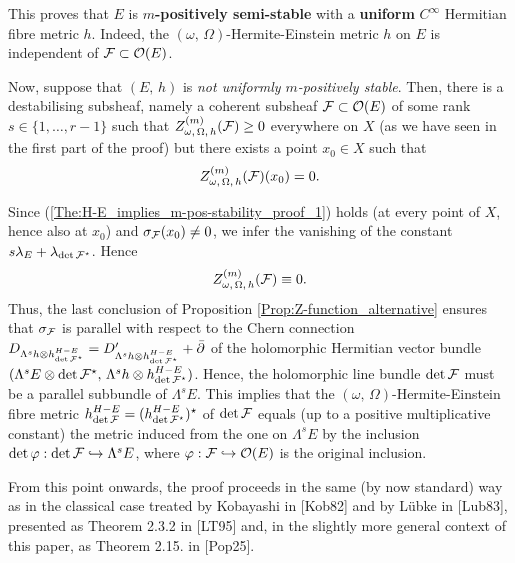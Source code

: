 \documentclass[12pt]{article}
\begin{document}
  This proves that $E$ is {\bf $m$-positively semi-stable} with a {\bf uniform} $C^\infty$ Hermitian fibre metric $h$. Indeed, the $(\omega,\,\Omega)$-Hermite-Einstein metric $h$ on $E$ is independent of ${\cal F}\subset{\cal O}(E)$.

\vspace{1ex}


Now, suppose that $(E,\,h)$ is {\it not uniformly $m$-positively stable}. Then, there is a destabilising subsheaf, namely a coherent subsheaf ${\cal F}\subset{\cal O}(E)$ of some rank $s\in\{1,\dots , r-1\}$ such that $Z_{\omega,\,\Omega,\,h}^{(m)}({\cal F})\geq 0$ everywhere on $X$ (as we have seen in the first part of the proof) but there exists a point $x_0\in X$ such that \begin{eqnarray*}Z_{\omega,\,\Omega,\,h}^{(m)}({\cal F})(x_0) = 0.\end{eqnarray*}

Since (\ref{The:H-E_implies_m-pos-stability_proof_1}) holds (at every point of $X$, hence also at $x_0$) and $\sigma_{\cal F}(x_0)\neq 0$, we infer the vanishing of the constant $s\lambda_E + \lambda_{\det{\cal F}^\star}$. Hence \begin{eqnarray*}Z_{\omega,\,\Omega,\,h}^{(m)}({\cal F})\equiv 0.\end{eqnarray*} Thus, the last conclusion of Proposition \ref{Prop:Z-function_alternative} ensures that $\sigma_{{\cal F}}$ is parallel with respect to the Chern connection $D_{\Lambda^sh\otimes h^{H-E}_{\det{\cal F}^\star}} = D_{\Lambda^sh\otimes h^{H-E}_{\det{\cal F}^\star}}' + \bar\partial$ of the holomorphic Hermitian vector bundle $(\Lambda^s E\otimes\det{\cal F}^\star,\,\Lambda^sh\otimes h^{H-E}_{\det{\cal F}^\star})$. Hence, the holomorphic line bundle $\det{\cal F}$ must be a parallel subbundle of $\Lambda^s E$. This implies that the $(\omega,\,\Omega)$-Hermite-Einstein fibre metric $h^{H-E}_{\det{\cal F}} = (h^{H-E}_{\det{\cal F}^\star})^\star$ of $\det{\cal F}$ equals (up to a positive multiplicative constant) the metric induced from the one on $\Lambda^s E$ by the inclusion $\det\varphi:\det{\cal F}\hookrightarrow\Lambda^s E$, where $\varphi:{\cal F}\hookrightarrow{\cal O}(E)$ is the original inclusion.

From this point onwards, the proof proceeds in the same (by now standard) way as in the classical case treated by Kobayashi in [Kob82] and by L\"ubke in [Lub83], presented as Theorem 2.3.2 in [LT95] and, in the slightly more general context of this paper, as Theorem 2.15. in [Pop25].
\end{document}
